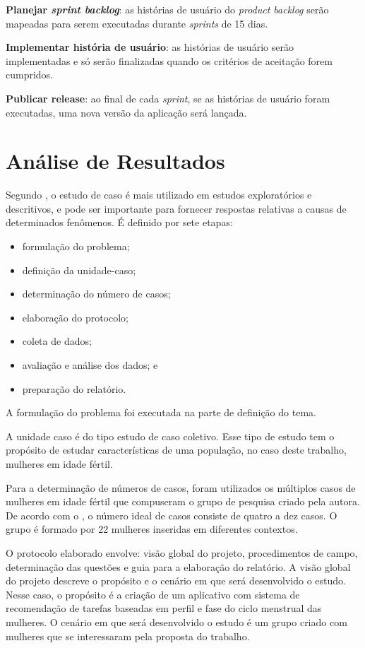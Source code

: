 \textbf{Planejar \emph{sprint backlog}}: as histórias de usuário do \emph{product backlog} serão mapeadas para serem executadas durante \emph{sprints} de 15 dias.

\textbf{Implementar história de usuário}: as histórias de usuário serão implementadas e só serão finalizadas quando os critérios de aceitação forem cumpridos.

\textbf{Publicar release}: ao final de cada \emph{sprint}, se as histórias de usuário foram executadas, uma nova versão da aplicação será lançada. 

\section{Análise de Resultados}

Segundo , o estudo de caso é mais utilizado em estudos exploratórios e descritivos, 
e pode ser importante para fornecer respostas relativas a causas de determinados fenômenos. É definido por sete etapas:
\begin{itemize}
	\item formulação do problema;
	\item definição da unidade-caso;
	\item determinação do número de casos;
	\item elaboração do protocolo;
	\item coleta de dados;
	\item avaliação e análise dos dados; e
	\item preparação do relatório.
\end{itemize}

A formulação do problema foi executada na parte de definição do tema.

A unidade caso é do tipo estudo de caso coletivo. Esse tipo de estudo tem o propósito de estudar características
de uma população, no caso deste trabalho, mulheres em idade fértil.

Para a determinação de números de casos, foram utilizados os múltiplos casos de mulheres em idade fértil que compuseram o grupo de pesquisa criado pela autora. De acordo com o , 
o número ideal de casos consiste de quatro a dez casos. O grupo é formado por 22 mulheres inseridas em diferentes contextos.

O protocolo elaborado envolve: visão global do projeto, procedimentos de campo, determinação das questões e guia para a elaboração do relatório.
A visão global do projeto descreve o propósito e o cenário em que será desenvolvido o estudo. Nesse caso, o propósito é a criação de um aplicativo com sistema de recomendação de tarefas baseadas 
em perfil e fase do ciclo menstrual das mulheres. O cenário em que será desenvolvido o estudo é um grupo criado com mulheres que se interessaram pela proposta do trabalho.

